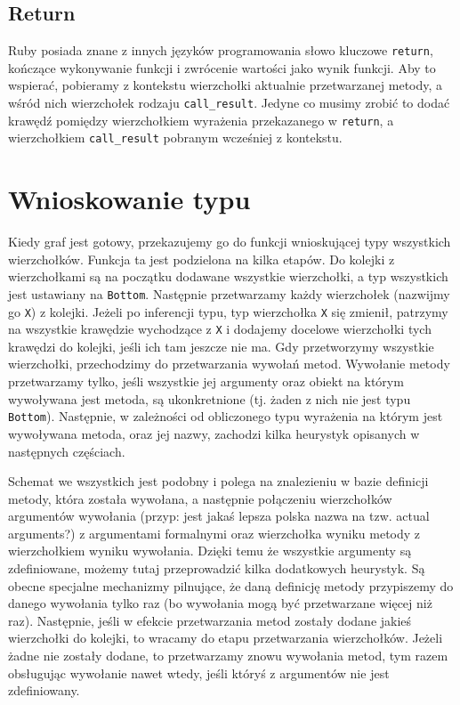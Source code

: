 \documentclass[declaration,shortabstract]{iithesis}
\begin{document}
\subsection{Return}

Ruby posiada znane z innych języków programowania słowo kluczowe \texttt{return}, kończące wykonywanie funkcji i zwrócenie wartości jako wynik funkcji. Aby to wspierać, pobieramy z kontekstu wierzchołki aktualnie przetwarzanej metody, a wśród nich wierzchołek rodzaju \texttt{call\_result}. Jedyne co musimy zrobić to dodać krawędź pomiędzy wierzchołkiem wyrażenia przekazanego w \texttt{return}, a wierzchołkiem \texttt{call\_result} pobranym wcześniej z kontekstu.




\section{Wnioskowanie typu}

Kiedy graf jest gotowy, przekazujemy go do funkcji wnioskującej typy wszystkich wierzchołków. Funkcja ta jest podzielona na kilka etapów.
Do kolejki z wierzchołkami są na początku dodawane wszystkie wierzchołki, a typ wszystkich jest ustawiany na \texttt{Bottom}.
Następnie przetwarzamy każdy wierzchołek (nazwijmy go \texttt{X}) z kolejki.
Jeżeli po inferencji typu, typ wierzchołka \texttt{X} się zmienił, patrzymy na wszystkie krawędzie wychodzące z \texttt{X} i dodajemy docelowe wierzchołki tych krawędzi do kolejki, jeśli ich tam jeszcze nie ma.
Gdy przetworzymy wszystkie wierzchołki, przechodzimy do przetwarzania wywołań metod.
Wywołanie metody przetwarzamy tylko, jeśli wszystkie jej argumenty oraz obiekt na którym wywoływana jest metoda, są ukonkretnione (tj. żaden z nich nie jest typu \texttt{Bottom}).
Następnie, w zależności od obliczonego typu wyrażenia na którym jest wywoływana metoda, oraz jej nazwy, zachodzi kilka heurystyk opisanych w następnych częściach.

Schemat we wszystkich jest podobny i polega na znalezieniu w bazie definicji metody, która została wywołana, a następnie połączeniu wierzchołków argumentów wywołania (przyp: jest jakaś lepsza polska nazwa na tzw. actual arguments?) z argumentami formalnymi oraz wierzchołka wyniku metody z wierzchołkiem wyniku wywołania.
Dzięki temu że wszystkie argumenty są zdefiniowane, możemy tutaj przeprowadzić kilka dodatkowych heurystyk.
Są obecne specjalne mechanizmy pilnujące, że daną definicję metody przypiszemy do danego wywołania tylko raz (bo wywołania mogą być przetwarzane więcej niż raz).
Następnie, jeśli w efekcie przetwarzania metod zostały dodane jakieś wierzchołki do kolejki, to wracamy do etapu przetwarzania wierzchołków.
Jeżeli żadne nie zostały dodane, to przetwarzamy znowu wywołania metod, tym razem obsługując wywołanie nawet wtedy, jeśli któryś z argumentów nie jest zdefiniowany.
\end{document}
